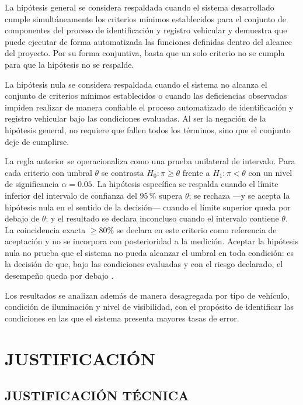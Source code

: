 La hipótesis general se considera respaldada cuando el sistema desarrollado
cumple simultáneamente los criterios mínimos establecidos para el conjunto de
componentes del proceso de identificación y registro vehicular y demuestra que
puede ejecutar de forma automatizada las funciones definidas dentro del alcance
del proyecto. Por su forma conjuntiva, basta que un solo criterio no se cumpla
para que la hipótesis no se respalde.

La hipótesis nula se considera respaldada cuando el sistema no alcanza el
conjunto de criterios mínimos establecidos o cuando las deficiencias observadas
impiden realizar de manera confiable el proceso automatizado de identificación y
registro vehicular bajo las condiciones evaluadas. Al ser la negación de la
hipótesis general, no requiere que fallen todos los términos, sino que el
conjunto deje de cumplirse.

La regla anterior se operacionaliza como una prueba unilateral de intervalo. Para
cada criterio con umbral $\theta$ se contrasta $H_0:\pi\ge\theta$ frente a
$H_1:\pi<\theta$ con un nivel de significancia $\alpha=0{.}05$. La hipótesis
específica se respalda cuando el límite inferior del intervalo de confianza del
$95$\,\% supera $\theta$; se rechaza ---y se acepta la hipótesis nula en el sentido
de la decisión--- cuando el límite superior queda por debajo de $\theta$; y el
resultado se declara inconcluso cuando el intervalo contiene $\theta$. La
coincidencia exacta $\geq 80\%$ se declara en este criterio como referencia de
aceptación y no se incorpora con posterioridad a la medición. Aceptar la hipótesis
nula no prueba que el sistema no pueda alcanzar el umbral en toda condición: es la
decisión de que, bajo las condiciones evaluadas y con el riesgo declarado, el
desempeño queda por debajo
\cite{schuirmann1987comparison,lakens2017equivalence,neyman1933problem,fisher1935design}.

Los resultados se analizan además de manera desagregada por tipo de
vehículo, condición de iluminación y nivel de visibilidad, con el propósito de
identificar las condiciones en las que el sistema presenta mayores tasas de error.

\section*{JUSTIFICACIÓN}

\subsection*{JUSTIFICACIÓN TÉCNICA}

